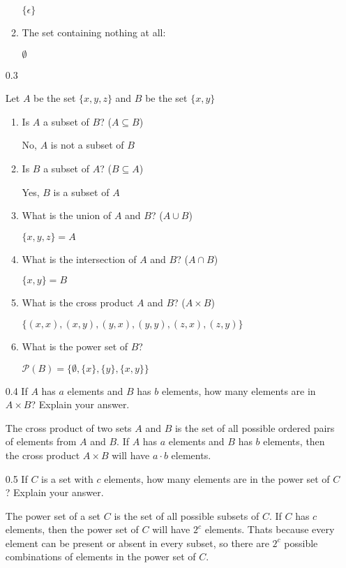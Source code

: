 \begin{enumerate}
\begin{enumerate}
    $\{\epsilon\}$
\item The set containing nothing at all:

    $\emptyset$
\end{enumerate}

    \item[0.3]

Let $A$ be the set $\{x,y,z\}$ and $B$ be the set $\{x,y\}$
\begin{enumerate}
\item Is $A$ a subset of $B$? ($A \subseteq B$) 

    No, $A$ is not a subset of $B$
\item Is $B$ a subset of $A$? ($B \subseteq A$) 

    Yes, $B$ is a subset of $A$
\item What is the union of $A$ and $B$? ($A \cup B$) 

    $\{x,y,z\} = A$
\item What is the intersection of $A$ and $B$? ($A \cap B$) 

    $\{x,y\} = B$
\item What is the cross product $A$ and $B$? ($A \times B$) 

    $\{(x,x), (x,y), (y,x), (y,y), (z,x), (z,y)\}$

\item What is the power set of $B$? 

$\mathcal{P}(B) = \{\emptyset, \{x\}, \{y\}, \{x,y\}\}$
\end{enumerate}

    \item[0.4]
If $A$ has  $a$  elements and  $B$  has  $b$  elements, how many elements are in  $A \times B$? 
Explain your answer.

The cross product of two sets $A$ and $B$ is the set of all possible ordered pairs of elements from $A$ and $B$. If $A$ has $a$ elements and $B$ has $b$ elements, then the cross product $A \times B$ will have $a \cdot b$ elements.

    \item[0.5]
If $C$ is a set with $c$ elements, how many elements are in the power set of $C$? 
Explain your answer.

The power set of a set $C$ is the set of all possible subsets of $C$. If $C$ has $c$ elements, then the power set of $C$ will have $2^c$ elements. Thats  because every element can be present or absent in every subset, so there are $2^c$ possible combinations of elements in the power set of $C$.


\end{enumerate}
